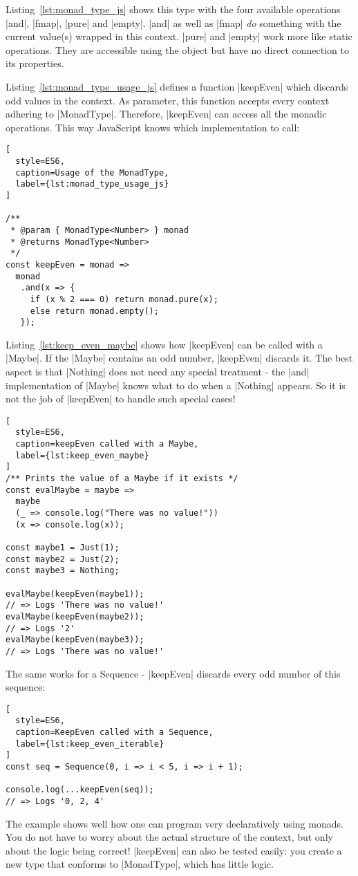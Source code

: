 Listing~\ref{lst:monad_type_js} shows this type with the four available
operations |and|, |fmap|, |pure| and |empty|. |and| as well as |fmap| \textit{do}
something with the current value(s) wrapped in this context. |pure| and |empty|
work more like static operations. They are accessible using the object but have
no direct connection to its properties. 

Listing~\ref{lst:monad_type_usage_js} defines a function |keepEven| which
discards odd values in the context. As parameter, this function accepts every context
adhering to |MonadType|. Therefore, |keepEven| can access all the monadic
operations. This way JavaScript knows which implementation to call:

\begin{lstlisting}[
  style=ES6,
  caption=Usage of the MonadType,
  label={lst:monad_type_usage_js}
]

/**
 * @param { MonadType<Number> } monad
 * @returns MonadType<Number>
 */
const keepEven = monad => 
  monad
   .and(x => {
     if (x % 2 === 0) return monad.pure(x);
     else return monad.empty();
   }); 
\end{lstlisting}

Listing~\ref{lst:keep_even_maybe} shows how |keepEven| can be called with a
|Maybe|. If the |Maybe| contains an odd number, |keepEven| discards it. The
best aspect is that |Nothing| does not need any special treatment - the
|and| implementation of |Maybe| knows what to do when a |Nothing| appears. So
it is not the job of |keepEven| to handle such special cases!

\begin{lstlisting}[
  style=ES6,
  caption=keepEven called with a Maybe,
  label={lst:keep_even_maybe}
]
/** Prints the value of a Maybe if it exists */
const evalMaybe = maybe =>
  maybe
  (_ => console.log("There was no value!"))
  (x => console.log(x));

const maybe1 = Just(1);
const maybe2 = Just(2);
const maybe3 = Nothing;

evalMaybe(keepEven(maybe1));
// => Logs 'There was no value!'
evalMaybe(keepEven(maybe2));
// => Logs '2'
evalMaybe(keepEven(maybe3));
// => Logs 'There was no value!'
\end{lstlisting}

The same works for a Sequence - |keepEven| discards every odd number of this
sequence:

\begin{lstlisting}[
  style=ES6,
  caption=KeepEven called with a Sequence,
  label={lst:keep_even_iterable}
]
const seq = Sequence(0, i => i < 5, i => i + 1);

console.log(...keepEven(seq));
// => Logs '0, 2, 4'
\end{lstlisting}
The example shows well how one can program very declaratively using monads. You
do not have to worry about the actual structure of the context, but only about
the logic being correct!
|keepEven| can also be tested easily: you create a new type that conforms to
|MonadType|, which has little logic.


